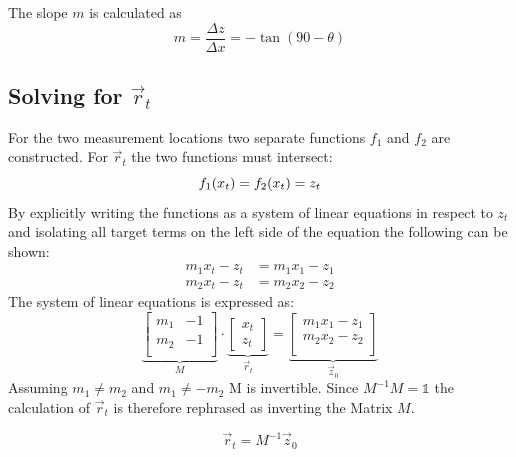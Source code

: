 \documentclass[a4paper,10pt]{article}
\begin{document}
\begin{multicols}{2}
    The slope $m$ is calculated as
    \begin{equation}
        m = \frac{\Delta z}{\Delta x} = -\tan(90-\theta)
    \end{equation}

    \subsection{Solving for $\vec r_t$}

    For the two measurement locations two separate functions $f_1$ and $f_2$ are constructed. For $\vec r_t$ the two functions must intersect:
    \begin{equation}
        f_1(x_t) = f_2(x_t) = z_t\\
    \end{equation}
    By explicitly writing the functions as a system of linear equations in respect to $z_t$ and isolating all target terms on the left side of the equation the following can be shown:
    \begin{align}
        m_1 x_t - z_t &= m_1 x_1 - z_1\\
        m_2 x_t - z_t &= m_2 x_2 - z_2
    \end{align}
    The system of linear equations is expressed as:
    \begin{equation}
        \underbrace{
        \begin{bmatrix}
            m_1 & -1\\
            m_2 & -1\\
        \end{bmatrix}}_M
        \cdot
        \underbrace{
        \begin{bmatrix}
            x_t \\ z_t
        \end{bmatrix}}_{\vec r_t}
         =
         \underbrace{
         \begin{bmatrix}
            m_1 x_1 - z_1\\
            m_2 x_2 - z_2\\  
         \end{bmatrix}}_{\vec z_0}
    \end{equation}
    Assuming $m_1 \ne m_2$ and $m_1 \ne -m_2$ M is invertible.
    Since $M^{-1}M = \mathbb{1}$ the calculation of $\vec{r}_t$ is therefore rephrased as inverting the Matrix $M$.

    \begin{equation}
        \vec r_t = M^{-1}{\vec z_0}
    \end{equation}


\end{multicols}
\end{document}
